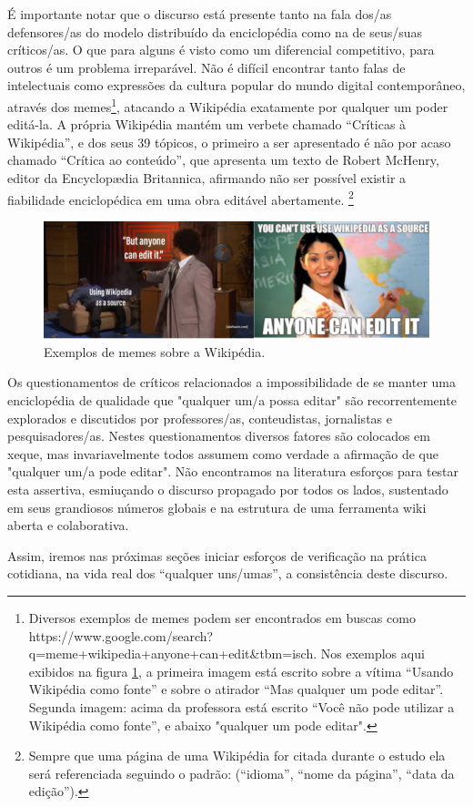 É importante notar que o discurso está presente tanto na fala dos/as defensores/as do modelo distribuído da enciclopédia como na de seus/suas críticos/as. O que para alguns é visto como um diferencial competitivo, para outros é um problema irreparável. Não é difícil encontrar tanto falas de intelectuais como expressões da cultura popular do mundo digital contemporâneo, através dos memes\footnote{Diversos exemplos de memes podem ser encontrados em buscas como https://www.google.com/search?q=meme+wikipedia+anyone+can+edit\&tbm=isch. Nos exemplos aqui exibidos na figura \ref{fig:memes}, a primeira imagem está escrito sobre a vítima ``Usando Wikipédia como fonte'' e sobre o atirador ``Mas qualquer um pode editar''. Segunda imagem: acima da professora está escrito ``Você não pode utilizar a Wikipédia como fonte'', e abaixo "qualquer um pode editar".}, atacando a Wikipédia exatamente por qualquer um poder editá-la. A própria Wikipédia mantém um verbete chamado ``Críticas à Wikipédia'', e dos seus 39 tópicos, o primeiro a ser apresentado é não por acaso chamado ``Crítica ao conteúdo'', que apresenta um texto de Robert McHenry, editor da Encyclopædia Britannica, afirmando não ser possível existir a fiabilidade enciclopédica em uma obra editável abertamente. \footnote{Sempre que uma página de uma Wikipédia for citada durante o estudo ela será referenciada seguindo o padrão: (``idioma'', ``nome da página'', ``data da edição'').}

\begin{figure}[H]
    \centering
    \includegraphics[width=1\textwidth]{Images/memes.png}
    \caption{Exemplos de memes sobre a Wikipédia.}
    \label{fig:memes}
\end{figure}

Os questionamentos de críticos relacionados a impossibilidade de se manter uma enciclopédia de qualidade que "qualquer um/a possa editar" são recorrentemente explorados e discutidos por professores/as, conteudistas, jornalistas e pesquisadores/as. Nestes questionamentos diversos fatores são colocados em xeque, mas invariavelmente todos assumem como verdade a afirmação de que "qualquer um/a pode editar". Não encontramos na literatura esforços para testar esta assertiva, esmiuçando o discurso propagado por todos os lados, sustentado em seus grandiosos números globais e na estrutura de uma ferramenta wiki aberta e colaborativa.

Assim, iremos nas próximas seções iniciar esforços de verificação na prática cotidiana, na vida real dos ``qualquer uns/umas'', a consistência deste discurso.